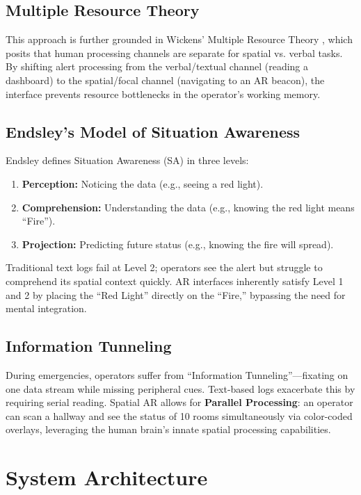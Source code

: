 \documentclass[conference]{IEEEtran}
\begin{document}
\subsection{Multiple Resource Theory}
This approach is further grounded in Wickens' Multiple Resource Theory \cite{b_wickens}, which posits that human processing channels are separate for spatial vs. verbal tasks. By shifting alert processing from the verbal/textual channel (reading a dashboard) to the spatial/focal channel (navigating to an AR beacon), the interface prevents resource bottlenecks in the operator's working memory.

\subsection{Endsley's Model of Situation Awareness}
Endsley defines Situation Awareness (SA) in three levels:
\begin{enumerate}
    \item \textbf{Perception:} Noticing the data (e.g., seeing a red light).
    \item \textbf{Comprehension:} Understanding the data (e.g., knowing the red light means ``Fire'').
    \item \textbf{Projection:} Predicting future status (e.g., knowing the fire will spread).
\end{enumerate}

Traditional text logs fail at Level 2; operators see the alert but struggle to comprehend its spatial context quickly. AR interfaces inherently satisfy Level 1 and 2 by placing the ``Red Light'' directly on the ``Fire,'' bypassing the need for mental integration.

\subsection{Information Tunneling}
During emergencies, operators suffer from ``Information Tunneling''---fixating on one data stream while missing peripheral cues. Text-based logs exacerbate this by requiring serial reading. Spatial AR allows for \textbf{Parallel Processing}: an operator can scan a hallway and see the status of 10 rooms simultaneously via color-coded overlays, leveraging the human brain's innate spatial processing capabilities.

\section{System Architecture}
\end{document}

